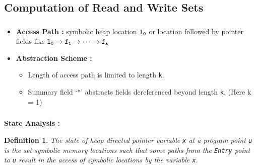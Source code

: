 \documentclass{beamer}
\newtheorem{mydef}{Definition}
\newcommand{\ttf}[1]{{\tt #1}}
\begin{document}
\subsection{Computation of Read and Write Sets}
\frame
{
	\frametitle{\subsecname}                                                  
	\begin{itemize}
	\item \textbf{Access Path :} symbolic heap location $\ttf{l_0}$ or location followed by pointer fields like $\ttf{l_0}\rightarrow\ttf{f_1}\rightarrow\cdots\rightarrow\ttf{f_k}$
	\end{itemize}
	\begin{figure}
	\begin{center}
	\scalebox{.6}{
	 }
	\end{center}
	\end{figure}
	\pause
	\begin{itemize}
	\item \textbf{Abstraction Scheme :}  
	\begin{itemize}
	\item Length of access path is limited to length \ttf{k}. 
	\item Summary field `*' abstracts fields dereferenced beyond length \ttf{k}. ({\blue Here k = 1})
	\end{itemize}
	\end{itemize}
	\begin{figure}
	\begin{center}
	\scalebox{.6}{
	 }
	\end{center}
	\end{figure}
	
	
}
\frame
{
	\frametitle{\subsecname}
	\textbf{State Analysis :} %
	\begin{mydef}{
The state of heap directed pointer variable {\tt x} at a program point {\tt u} is the set symbolic memory locations such that some paths from the {\tt Entry} point to {\tt u} result in the access of symbolic locations by the variable \ttf{x}. }
\end{mydef}
\pause
\begin{figure}
	\begin{center}
	\scalebox{.6}{
	 }
	\end{center}
	\end{figure}
}
\end{document}

